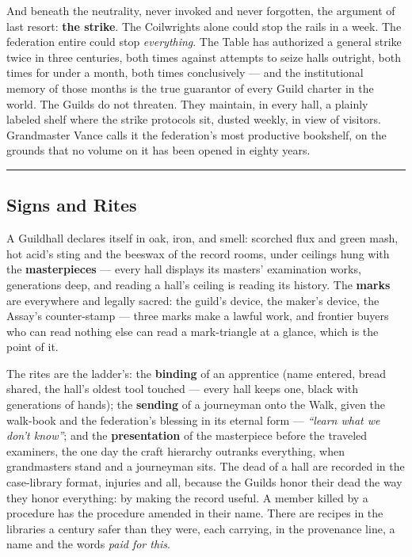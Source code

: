 And beneath the neutrality, never invoked and never forgotten, the argument of last resort: \textbf{the strike}. The Coilwrights alone could stop the rails in a week. The federation entire could stop \textit{everything}. The Table has authorized a general strike twice in three centuries, both times against attempts to seize halls outright, both times for under a month, both times conclusively --- and the institutional memory of those months is the true guarantor of every Guild charter in the world. The Guilds do not threaten. They maintain, in every hall, a plainly labeled shelf where the strike protocols sit, dusted weekly, in view of visitors. Grandmaster Vance calls it the federation's most productive bookshelf, on the grounds that no volume on it has been opened in eighty years.

\medskip\hrule\medskip

\subsection{Signs and Rites}

A Guildhall declares itself in oak, iron, and smell: scorched flux and green mash, hot acid's sting and the beeswax of the record rooms, under ceilings hung with the \textbf{masterpieces} --- every hall displays its masters' examination works, generations deep, and reading a hall's ceiling is reading its history. The \textbf{marks} are everywhere and legally sacred: the guild's device, the maker's device, the Assay's counter-stamp --- three marks make a lawful work, and frontier buyers who can read nothing else can read a mark-triangle at a glance, which is the point of it.

The rites are the ladder's: the \textbf{binding} of an apprentice (name entered, bread shared, the hall's oldest tool touched --- every hall keeps one, black with generations of hands); the \textbf{sending} of a journeyman onto the Walk, given the walk-book and the federation's blessing in its eternal form --- \textit{``learn what we don't know''}; and the \textbf{presentation} of the masterpiece before the traveled examiners, the one day the craft hierarchy outranks everything, when grandmasters stand and a journeyman sits. The dead of a hall are recorded in the case-library format, injuries and all, because the Guilds honor their dead the way they honor everything: by making the record useful. A member killed by a procedure has the procedure amended in their name. There are recipes in the libraries a century safer than they were, each carrying, in the provenance line, a name and the words \textit{paid for this}.

